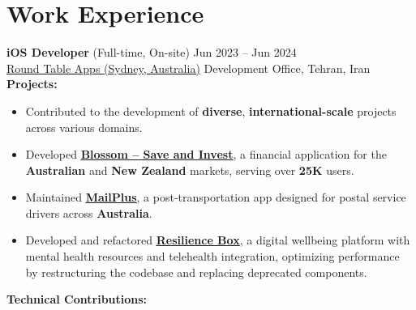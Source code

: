 \documentclass[letter,10pt]{article}
\newcommand{\customsquare}{\raisebox{0.25ex}{\scalebox{0.45}{$\blacksquare$}}}
\begin{document}
\section*{Work Experience}
\textbf{iOS Developer} (Full-time, On-site) \hfill Jun 2023 -- Jun 2024 \\
\href{https://roundtableapps.com}{\underline{Round Table Apps (Sydney, Australia)}} \hfill Development Office, Tehran, Iran \\ [5pt]
\textbf{Projects:}
\begin{itemize}[label={\customsquare}]
    \item Contributed to the development of \textbf{diverse}, \textbf{international-scale} projects across various domains.
    \item Developed \href{https://www.blossomapp.com}{\underline{\textbf{Blossom -- Save and Invest}}}, a financial application for the \textbf{Australian} and \textbf{New Zealand} markets, serving over \textbf{25K} users.
    \item Maintained \href{https://mailplus.com.au}{\underline{\textbf{MailPlus}}}, a post-transportation app designed for postal service drivers across \textbf{Australia}.
    \item Developed and refactored \href{https://app.resiliencebox.com}{\underline{\textbf{Resilience Box}}}, a digital wellbeing platform with mental health resources and telehealth integration, optimizing performance by restructuring the codebase and replacing deprecated components.
\end{itemize}
\textbf{Technical Contributions:}
\end{document}
